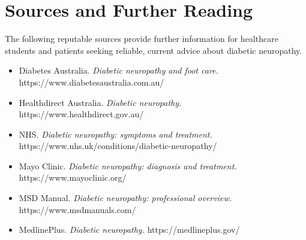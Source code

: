\section*{Sources and Further Reading}
The following reputable sources provide further information for healthcare students and patients seeking reliable, current advice about diabetic neuropathy.

\begin{itemize}
    \item Diabetes Australia. \textit{Diabetic neuropathy and foot care.} https://www.diabetesaustralia.com.au/
    \item Healthdirect Australia. \textit{Diabetic neuropathy.} https://www.healthdirect.gov.au/
    \item NHS. \textit{Diabetic neuropathy: symptoms and treatment.} https://www.nhs.uk/conditions/diabetic-neuropathy/
    \item Mayo Clinic. \textit{Diabetic neuropathy: diagnosis and treatment.} https://www.mayoclinic.org/
    \item MSD Manual. \textit{Diabetic neuropathy: professional overview.} https://www.msdmanuals.com/
    \item MedlinePlus. \textit{Diabetic neuropathy.} https://medlineplus.gov/
\end{itemize}
